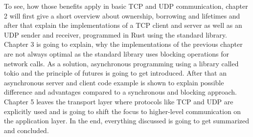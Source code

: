 To see, how those benefits apply in basic TCP and UDP communication, chapter 2 will first give a short overview about
ownership, borrowing and lifetimes and after that explain the implementations of a TCP client and server as well as an
UDP sender and receiver, programmed in Rust using the standard library. Chapter 3 is going to explain, why the
implementations of the previous chapter are not always optimal as the standard library uses blocking operations for
network calls. As a solution, asynchronous programming using a library called tokio and the principle of futures is
going to get introduced. After that an asynchronous server and client code example is shown to explain possible
difference and advantages compared to a synchronous and blocking approach. Chapter 5 leaves the transport layer where
protocols like TCP and UDP are explicitly used and is going to shift the focus to higher-level communication on the
application layer. In the end, everything discussed is going to get summarized and concluded.
